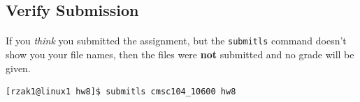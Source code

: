 \documentclass[letter,11pt]{article}
\begin{document}
\subsection*{Verify Submission}
\paragraph{}If you \textit{think} you submitted the assignment, but the \texttt{submitls} command doesn't show you your file names, then the files were \textbf{not} submitted and no grade will be given.
\begin{verbatim}
[rzak1@linux1 hw8]$ submitls cmsc104_10600 hw8
\end{verbatim}
\end{document}
